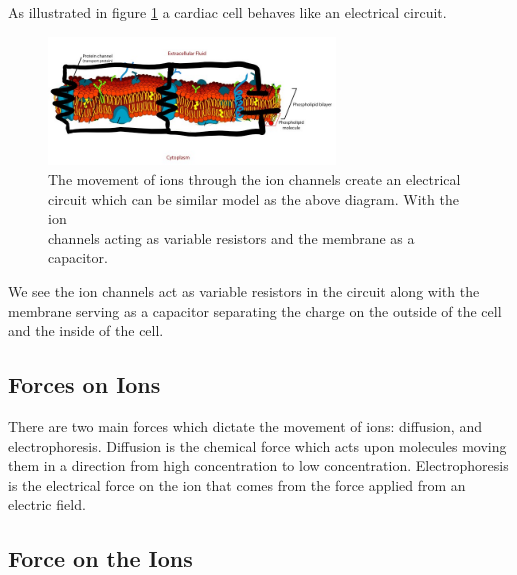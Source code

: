 \documentclass{bmcart}%
\begin{document}
 As illustrated in figure \ref{fig:CellCircuit} a cardiac cell behaves like an electrical circuit.
 \begin{figure}[h!]
  \centering
  \includegraphics[width=3in]{CellCircuit}
  \caption[cell circuit]
  {The movement of ions through the ion channels create an electrical\\
  circuit which can be similar model as the above diagram. With the ion\\
  channels acting as variable resistors and the membrane as a capacitor.\cite{ElecticMem}}
\label{fig:CellCircuit}
\end{figure}

We see the ion channels act as variable resistors in the circuit along with the membrane serving as a capacitor separating the charge on the outside of the cell and the inside of the cell.
 
 \subsection*{Forces on Ions}
 
 There are two main forces which dictate the movement of ions: diffusion, and electrophoresis. Diffusion is the chemical force which acts upon molecules moving them in a direction from high concentration to low  concentration. Electrophoresis is the electrical force on the ion that comes from the force applied from an electric field.\cite{Besse2007}

\subsection*{Force on the Ions}
\end{document}
